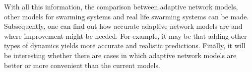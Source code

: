 With all this information, the comparison between adaptive network models, other models for swarming systems and real life swarming systems can be made. Subsequently, one can find out how accurate adaptive network models are and where improvement might be needed. For example, it may be that adding other types of dynamics yields more accurate and realistic predictions. Finally, it will be interesting whether there are cases in which adaptive network models are better or more convenient than the current models.




